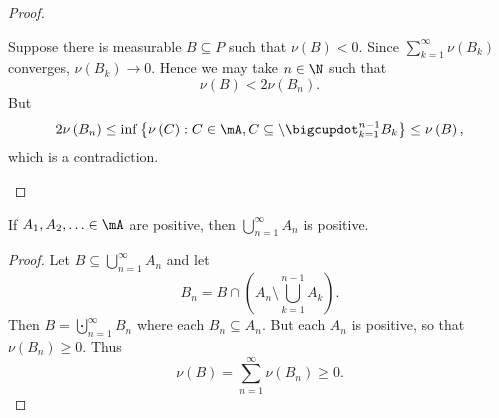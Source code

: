 \documentclass[pmath451]{subfiles}
\begin{document}
\begin{proof}
\begin{claim}
            Suppose there is measurable $B\subseteq P$ such that $\nu\left( B \right)<0$. Since $\sum^{\infty}_{k=1}\nu\left( B_k \right)$ converges, $\nu\left( B_k \right)\to 0$. Hence we may take $n\in\N$ such that
            \begin{equation*}
                \nu\left( B \right) < 2\nu\left( B_n \right).
            \end{equation*}
            But
            \begin{equation*}
                2\nu\left( B_n \right) \leq \inf\left\lbrace \nu\left( C \right): C\in\mA, C\subseteq\setminus\bigcupdot^{n-1}_{k=1}B_k \right\rbrace \leq\nu\left( B \right),
            \end{equation*}
            which is a contradiction.
        \end{claim}
    \end{proof}
    
    \begin{lemma_inside}{}
        If $A_1,A_2,\ldots\in\mA$ are positive, then $\bigcup^{\infty}_{n=1} A_n$ is positive.
    \end{lemma_inside}

    \begin{proof}
        Let $B\subseteq\bigcup^{\infty}_{n=1}A_n$ and let
        \begin{equation*}
            B_n = B\cap\left( A_n\setminus \bigcup^{n-1}_{k=1} A_k \right).
        \end{equation*}
        Then $B = \bigcupdot^{\infty}_{n=1} B_n$ where each $B_n\subseteq A_n$. But each $A_n$ is positive, so that $\nu\left( B_n \right)\geq 0$. Thus
        \begin{equation*}
            \nu\left( B \right) = \sum^{\infty}_{n=1} \nu\left( B_n \right)\geq 0.
        \end{equation*}
    \end{proof}
    
\end{document}
